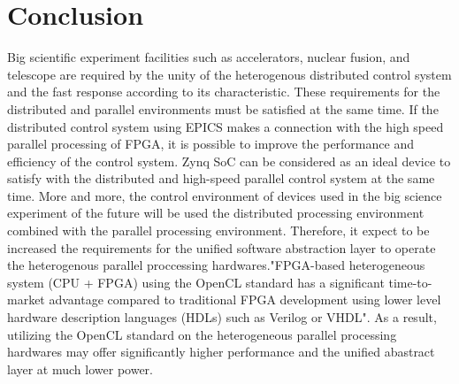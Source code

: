 \documentclass[journal]{IEEEtran}
\begin{document}
\section{Conclusion}
Big scientific experiment facilities such as accelerators, nuclear fusion, and telescope are  required by the unity of the heterogenous distributed control system and the fast response  according to its characteristic. These requirements for the distributed and parallel environments must be satisfied at the same time. If the distributed control system using EPICS makes a connection with the high speed parallel processing of FPGA, it is possible to improve the performance and efficiency of the control system. Zynq SoC can be considered as an ideal device to satisfy with the distributed and high-speed parallel control system at the same time. More and more, the control environment of devices used in the big science experiment of the future will be used the distributed processing environment combined with the parallel processing environment. Therefore, it expect to be increased the requirements for the unified software abstraction layer to operate the heterogenous parallel proccessing hardwares."FPGA-based heterogeneous system (CPU + FPGA) using the OpenCL standard has a significant time-to-market advantage compared to traditional FPGA development using lower level hardware description languages (HDLs) such as Verilog or VHDL"\cite{opencl_on_altera}.  As a result, utilizing the OpenCL standard on the heterogeneous parallel processing hardwares may offer significantly higher performance and the unified abastract layer at much lower power. 
\end{document}
